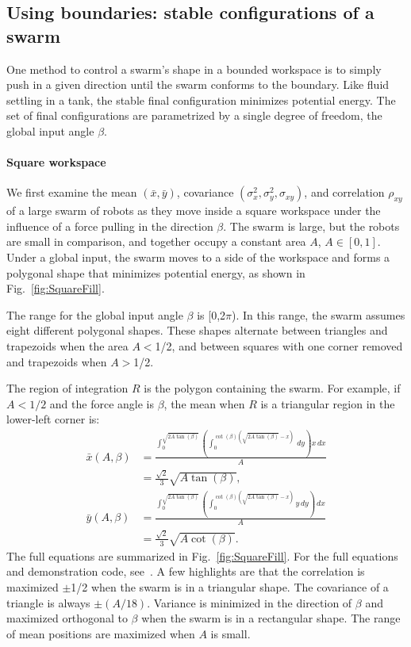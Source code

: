 \subsection{Using boundaries: stable configurations of a swarm}\label{subsec:FluidInTank}
One method to control a swarm's shape in a bounded workspace is to simply push in a given direction until the swarm conforms to the boundary. Like fluid settling in a tank, the stable final configuration minimizes potential energy. The set of final configurations are parametrized by a single degree of freedom, the global input angle $\beta$.
\paragraph{Square workspace}
We first examine the mean $(\bar{x},\bar{y})$, covariance $(\sigma^2_x,\sigma^2_y,\sigma_{xy})$, and correlation $\rho_{xy}$ of a large swarm of robots as they move inside a square workspace under the influence of a force pulling in the direction $\beta$. The swarm is large, but the robots are small in comparison, and together occupy a constant area $A$, $A\in [0,1]$. Under a global input, the swarm moves to a side of the workspace and forms a polygonal shape that minimizes potential energy, as shown in Fig.~\ref{fig:SquareFill}. %

The range for the global input angle $\beta $ is [0,2$\pi $). In this range, the swarm assumes eight different polygonal shapes. 
These shapes alternate between triangles and trapezoids when the area $A$$<$1/2, and between squares with one corner removed and trapezoids when $A$$>$1/2.


The region of integration $R$ is the polygon containing the swarm. For example, if $A<1/2$ and the force angle is $\beta$, the mean when $R$ is a triangular region in the lower-left corner is:
\begin{align}\label{eq:meanInSquareWorkspaceLL}
\bar{x}(A,\beta) &= \frac{\int_0^{\sqrt{2 A \tan (\beta)}} \left(\int_0^{\cot (\beta) \left(\sqrt{2 A \tan (\beta)}-x\right)} \, dy\right) x \, dx}{A} \nonumber \\
	&=\frac{ \sqrt{2}}{3} \sqrt{A \tan (\beta )},\\
\bar{y}(A,\beta) &= \frac{\int_0^{\sqrt{2 A \tan (\beta)}} \left(\int_0^{\cot (\beta) \left(\sqrt{2 A \tan (\beta)}-x\right)} y \, dy\right) \, dx}{A} \nonumber\\
	&=\frac{\sqrt{2}}{3}  \sqrt{A \cot (\beta )}.
\end{align}
The full equations are summarized in Fig.~\ref{fig:SquareFill}. For the full equations and demonstration code, see~\cite{Haoran2016SwarminSquare}. A few highlights are that the correlation is maximized $\pm$1/2 when the swarm is in a triangular shape. The covariance of a triangle is always $\pm(A/18)$. Variance is minimized in the direction of $\beta$ and maximized orthogonal to $\beta$ when the swarm is in a rectangular shape. The range of mean positions are maximized when $A$ is small.


